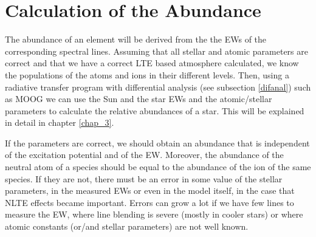 \documentclass[dvips,12pt,a4paper]{report}
\begin{document}
{\section{Calculation of the Abundance}
\label{calab}

The abundance of an element will be derived from the the EWs of the corresponding spectral lines. %
Assuming that all stellar and atomic parameters are correct and that we have a correct LTE based atmosphere calculated, we know the populations of the atoms and ions in their different levels. Then, using a radiative transfer program with differential analysis (see subsection \ref{difanal}) such as MOOG \citep{Sneden-1973} we can use the Sun and the star EWs and the atomic/stellar parameters to calculate the relative abundances of a star. This will be explained in detail in chapter \ref{chap_3}.

If the parameters are correct, we should obtain an abundance that is independent of the excitation potential and of the EW. Moreover, the abundance of the neutral atom of a species should be equal to the abundance of the ion of the same species. If they are not, there must be an error in some value of the stellar parameters, in the measured EWs or even in the model itself, in the case that NLTE effects became important. Errors can grow a lot if we have few lines to measure the EW, where line blending is severe (mostly in cooler stars) or where atomic constants (or/and stellar parameters) are not well known.





}
\end{document}
